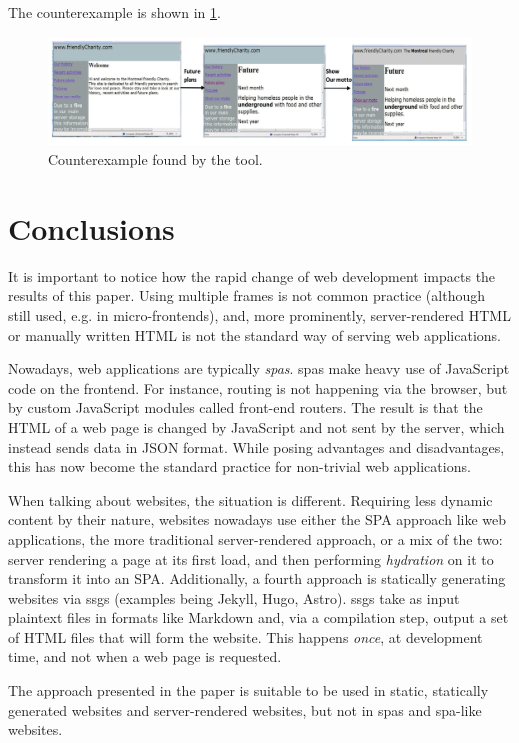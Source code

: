 \documentclass[a4paper,10pt]{article}
\theoremstyle{plain} %
\theoremstyle{definition}
\theoremstyle{remark}
\begin{document}
The counterexample is shown in \cref{fig:counterexample}.

\begin{figure}[h]
  \includegraphics[width=\textwidth]{img/counterexample.png}
  \caption{Counterexample found by the tool.}
  \label{fig:counterexample}
\end{figure}

\section{Conclusions}

It is important to notice how the rapid change of web development impacts the results of this paper. Using multiple frames is not common practice (although still used, e.g. in micro-frontends), and, more prominently, server-rendered HTML or manually written HTML is not the standard way of serving web applications.

Nowadays, web applications are typically \textit{\glspl{spa}}. \glspl{spa} make heavy use of JavaScript code on the frontend. For instance, routing is not happening via the browser, but by custom JavaScript modules called front-end routers.  The result is that the HTML of a web page is changed by JavaScript and not sent by the server, which instead sends data in JSON format. While posing advantages and disadvantages, this has now become the standard practice for non-trivial web applications.

When talking about websites, the situation is different. Requiring less dynamic content by their nature, websites nowadays use either the SPA approach like web applications, the more traditional server-rendered approach, or a mix of the two: server rendering a page at its first load, and then performing \emph{hydration} on it to transform it into an SPA. Additionally, a fourth approach is statically generating websites via \glspl{ssg} (examples being Jekyll\cite{JekyllWeb}, Hugo\cite{HugoWeb}, Astro\cite{AstroWeb}). \glspl{ssg} take as input plaintext files in formats like Markdown and, via a compilation step, output a set of HTML files that will form the website. This happens \emph{once}, at development time, and not when a web page is requested.

The approach presented in the paper is suitable to be used in static, statically generated websites and server-rendered websites, but not in \acrlong{spa}s and \gls{spa}-like websites.


\clearpage
\printbibliography
\end{document}
